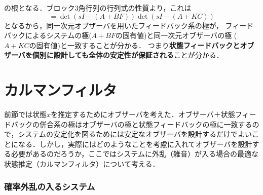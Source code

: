 の根となる．ブロック3角行列の行列式の性質より，これは
\begin{equation}
 = \det(sI - (A + BF))\det(sI - (A + KC))
\end{equation}
となるから，同一次元オブザーバを用いたフィードバック系の極が，
フィードバックによるシステムの極($A + BF$の固有値)と同一次元オブザーバの極
($A + KC$の固有値)と一致することが分かる．
つまり{\bf 状態フィードバックとオブザーバを個別に設計しても全体の安定性が保証される}ことが分かる．





\section{カルマンフィルタ}

前節では状態$x$を推定するためにオブザーバを考えた．オブザーバ＋状態フィードバックの併合系の極はオブザーバの極と状態フィードバックの極に一致するので，システムの安定化を図るためには安定なオブザーバを設計するだけでよいことになる．しかし，実際にはどのようなことを考慮に入れてオブザーバを設計する必要があるのだろうか，ここではシステムに外乱（雑音）が入る場合の最適な状態推定（カルマンフィルタ）について考える．

\subsubsection{確率外乱の入るシステム}

